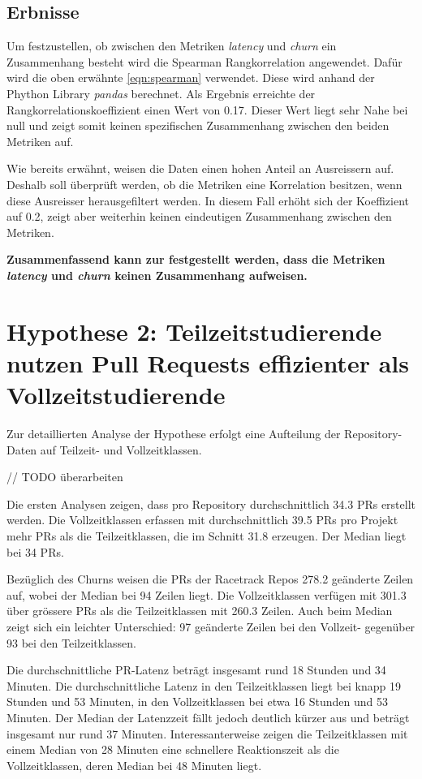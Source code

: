 \subsection{Erbnisse}
Um festzustellen, ob zwischen den Metriken \textit{latency} und \textit{churn} ein Zusammenhang besteht wird die Spearman Rangkorrelation angewendet. Dafür wird die oben erwähnte \autoref{eqn:spearman} verwendet. Diese wird anhand der Phython Library \textit{pandas} berechnet. Als Ergebnis erreichte der Rangkorrelationskoeffizient einen Wert von 0.17. Dieser Wert liegt sehr Nahe bei null und zeigt somit keinen spezifischen Zusammenhang zwischen den beiden Metriken auf. 

Wie bereits erwähnt, weisen die Daten einen hohen Anteil an Ausreissern auf. Deshalb soll überprüft werden, ob die Metriken eine Korrelation besitzen, wenn diese Ausreisser herausgefiltert werden. In diesem Fall erhöht sich der Koeffizient auf 0.2, zeigt aber weiterhin keinen eindeutigen Zusammenhang zwischen den Metriken.

\textbf{Zusammenfassend kann zur  festgestellt werden, dass die Metriken \textit{latency} und \textit{churn} keinen Zusammenhang aufweisen.}

\section{Hypothese 2: Teilzeitstudierende nutzen Pull Requests effizienter als Vollzeitstudierende}
Zur detaillierten Analyse der Hypothese erfolgt eine Aufteilung der Repository-Daten auf Teilzeit- und Vollzeitklassen.

// TODO überarbeiten

Die ersten Analysen zeigen, dass pro Repository durchschnittlich 34.3 PRs erstellt werden. Die Vollzeitklassen erfassen mit durchschnittlich 39.5 PRs pro Projekt mehr PRs als die Teilzeitklassen, die im Schnitt 31.8 erzeugen. Der Median liegt bei 34 PRs.

Bezüglich des Churns weisen die PRs der Racetrack Repos 278.2 geänderte Zeilen auf, wobei der Median bei 94 Zeilen liegt. Die Vollzeitklassen verfügen mit 301.3 über grössere PRs als die Teilzeitklassen mit 260.3 Zeilen. Auch beim Median zeigt sich ein leichter Unterschied: 97 geänderte Zeilen bei den Vollzeit- gegenüber 93 bei den Teilzeitklassen. 

Die durchschnittliche PR-Latenz beträgt insgesamt rund 18 Stunden und 34 Minuten. Die durchschnittliche Latenz in den Teilzeitklassen liegt bei knapp 19 Stunden und 53 Minuten, in den Vollzeitklassen bei etwa 16 Stunden und 53 Minuten. Der Median der Latenzzeit fällt jedoch deutlich kürzer aus und beträgt insgesamt nur rund 37 Minuten. Interessanterweise zeigen die Teilzeitklassen mit einem Median von 28 Minuten eine schnellere Reaktionszeit als die Vollzeitklassen, deren Median bei 48 Minuten liegt.

